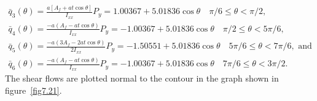 \documentclass{AeroStructure-ERJohnson}
\begin{document}
\begin{example}
\begin{gather}
\bar{q}_{3}(\theta)=\frac{a[A_{f}+a t \cos \theta]}{I_{x x}} P_{y}=1.00367+5.01836 \cos \theta \quad \pi / 6 \leq \theta<\pi / 2, \label{eq7.6.n}\tag{n} \\[3pt]
\bar{q}_{4}(\theta)=\frac{-a(A_{f}-a t \cos \theta)}{I_{x x}} P_{y}=-1.00367+5.01836 \cos \theta \quad \pi / 2 \leq \theta<5 \pi / 6, \label{eq7.6.o}\tag{o} \\[3pt]
\bar{q}_{5}(\theta)=\frac{-a(3 A_{f}-2 a t \cos \theta)}{2 I_{x x}} P_{y}=-1.50551+5.01836 \cos \theta \quad 5 \pi / 6 \leq \theta<7 \pi / 6, \textrm{ and}\label{eq7.6.p}\tag{p}\\[3pt]
\bar{q}_{6}(\theta)=\frac{-a(A_{f}-a t \cos \theta)}{I_{x x}} P_{y}=-1.00367+5.01836 \cos \theta \quad 7 \pi / 6 \leq \theta<3 \pi / 2. \label{eq7.6.q}\tag{q}
\end{gather}
The shear flows are plotted normal to the contour in the graph shown in figure~\ref{fig7.21}.
\end{example}

{\def\thefigure{7.21}
}

\clearpage
\end{document}

